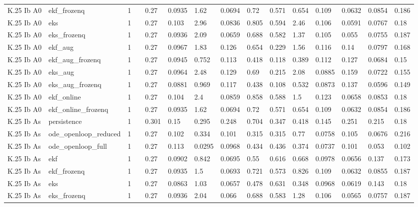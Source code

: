 \begin{table}[t]
\begin{tabular}{lllllllllllllll}
K.25 Ib A0 & ekf\_frozenq & 1 &  & 0.27 & 0.0935 & 1.62 & 0.0694 & 0.72 & 0.571 & 0.654 & 0.109 & 0.0632 & 0.0854 & 0.186 \\
K.25 Ib A0 & eks & 1 &  & 0.27 & 0.103 & 2.96 & 0.0836 & 0.805 & 0.594 & 2.46 & 0.106 & 0.0591 & 0.0767 & 0.18 \\
K.25 Ib A0 & eks\_frozenq & 1 &  & 0.27 & 0.0936 & 2.09 & 0.0659 & 0.688 & 0.582 & 1.37 & 0.105 & 0.055 & 0.0755 & 0.187 \\
K.25 Ib A0 & ekf\_aug & 1 &  & 0.27 & 0.0967 & 1.83 & 0.126 & 0.654 & 0.229 & 1.56 & 0.116 & 0.14 & 0.0797 & 0.168 \\
K.25 Ib A0 & ekf\_aug\_frozenq & 1 &  & 0.27 & 0.0945 & 0.752 & 0.113 & 0.418 & 0.118 & 0.389 & 0.112 & 0.127 & 0.0684 & 0.15 \\
K.25 Ib A0 & eks\_aug & 1 &  & 0.27 & 0.0964 & 2.48 & 0.129 & 0.69 & 0.215 & 2.08 & 0.0885 & 0.159 & 0.0722 & 0.155 \\
K.25 Ib A0 & eks\_aug\_frozenq & 1 &  & 0.27 & 0.0881 & 0.969 & 0.117 & 0.438 & 0.108 & 0.532 & 0.0873 & 0.137 & 0.0596 & 0.149 \\
K.25 Ib A0 & ekf\_online & 1 &  & 0.27 & 0.104 & 2.4 & 0.0859 & 0.858 & 0.588 & 1.5 & 0.123 & 0.0658 & 0.0853 & 0.18 \\
K.25 Ib A0 & ekf\_online\_frozenq & 1 &  & 0.27 & 0.0935 & 1.62 & 0.0694 & 0.72 & 0.571 & 0.654 & 0.109 & 0.0632 & 0.0854 & 0.186 \\
K.25 Ib As & persistence & 1 &  & 0.301 & 0.15 & 0.295 & 0.248 & 0.704 & 0.347 & 0.418 & 0.145 & 0.251 & 0.215 & 0.18 \\
K.25 Ib As & ode\_openloop\_reduced & 1 &  & 0.27 & 0.102 & 0.334 & 0.101 & 0.315 & 0.315 & 0.77 & 0.0758 & 0.105 & 0.0676 & 0.216 \\
K.25 Ib As & ode\_openloop\_full & 1 &  & 0.27 & 0.113 & 0.0295 & 0.0968 & 0.434 & 0.436 & 0.374 & 0.0737 & 0.101 & 0.053 & 0.102 \\
K.25 Ib As & ekf & 1 &  & 0.27 & 0.0902 & 0.842 & 0.0695 & 0.55 & 0.616 & 0.668 & 0.0978 & 0.0656 & 0.137 & 0.173 \\
K.25 Ib As & ekf\_frozenq & 1 &  & 0.27 & 0.0935 & 1.5 & 0.0693 & 0.721 & 0.573 & 0.826 & 0.109 & 0.0632 & 0.0855 & 0.187 \\
K.25 Ib As & eks & 1 &  & 0.27 & 0.0863 & 1.03 & 0.0657 & 0.478 & 0.631 & 0.348 & 0.0968 & 0.0619 & 0.143 & 0.18 \\
K.25 Ib As & eks\_frozenq & 1 &  & 0.27 & 0.0936 & 2.04 & 0.066 & 0.688 & 0.583 & 1.28 & 0.106 & 0.0565 & 0.0757 & 0.187 \\

\end{tabular}
\end{table}

